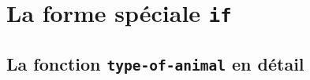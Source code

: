 \section{La forme spéciale \texttt{if}}

\subsection{La fonction \texttt{type-of-animal} en
  détail}
